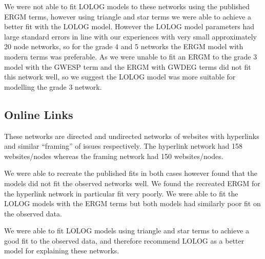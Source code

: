 \documentclass[
]{statsoc}
\begin{document}
We were not able to fit LOLOG models to these networks using the
published ERGM terms, however using triangle and star terms we were able
to achieve a better fit with the LOLOG model. However the LOLOG model
parameters had large standard errors in line with our experiences with
very small approximately 20 node networks, so for the grade 4 and 5
networks the ERGM model with modern terms was preferable. As we were
unable to fit an ERGM to the grade 3 model with the GWESP term and the
ERGM with GWDEG terms did not fit this network well, so we suggest the
LOLOG model was more suitable for modelling the grade 3 network.

\subsection{Online Links}

These networks are directed and undirected networks of websites with
hyperlinks and similar ``framing'' of issues respectively. The hyperlink
network had 158 websites/nodes whereas the framing network had 150
websites/nodes.

We were able to recreate the published fits in both cases however found
that the models did not fit the observed networks well. We found the
recreated ERGM for the hyperlink network in particular fit very poorly.
We were able to fit the LOLOG models with the ERGM terms but both models
had similarly poor fit on the observed data.

We were able to fit LOLOG models using triangle and star terms to
achieve a good fit to the observed data, and therefore recommend LOLOG
as a better model for explaining these networks.



\end{document}

